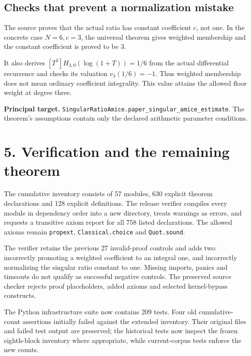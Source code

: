 \documentclass[11pt]{article}
\newcommand{\coef}[2]{[#1^{#2}]}
\begin{document}
\subsection*{Checks that prevent a normalization mistake}
The source proves that the actual ratio has constant coefficient $c$, not one. In the concrete case $N=6,c=3$, the universal theorem gives weighted membership and the constant coefficient is proved to be $3$.

It also derives $\coef{T}{3}H_{3,0}(\log(1+T))=1/6$ from the actual differential recurrence and checks its valuation $v_3(1/6)=-1$. Thus weighted membership does not mean ordinary coefficient integrality. This value attains the allowed floor weight at degree three.

\textbf{Principal target.} \texttt{SingularRatioAmice.paper\_singular\_amice\_estimate}. The theorem's assumptions contain only the declared arithmetic parameter conditions.
\newpage
\section*{5. Verification and the remaining theorem}
The cumulative inventory consists of 57 modules, 630 explicit theorem declarations and 128 explicit definitions. The release verifier compiles every module in dependency order into a new directory, treats warnings as errors, and requests a transitive axiom report for all 758 listed declarations. The allowed axioms remain \texttt{propext}, \texttt{Classical.choice} and \texttt{Quot.sound}.

The verifier retains the previous 27 invalid-proof controls and adds two: incorrectly promoting a weighted coefficient to an integral one, and incorrectly normalizing the singular ratio constant to one. Missing imports, panics and timeouts do not qualify as successful negative controls. The preserved source checker rejects proof placeholders, added axioms and selected kernel-bypass constructs.

The Python infrastructure suite now contains 209 tests. Four old cumulative-count assertions initially failed against the extended inventory. Their original files and failed test output are preserved; the historical tests now inspect the frozen eighth-block inventory where appropriate, while current-corpus tests enforce the new counts.
\end{document}
